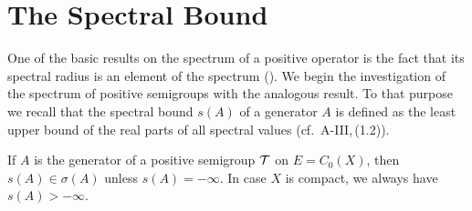 \section{The Spectral Bound}\label{sec:b3-1}%
One of the basic results on the spectrum of a positive operator is the fact that its spectral radius is an element of the spectrum (\citet[V.Proposition~4.1]{schaefer:1974}).
We begin the investigation of the spectrum of positive semigroups with the analogous result.
To that purpose we recall that the spectral bound $s(A)$ of a generator $A$ is defined as the least upper bound of the real parts of all spectral values (cf.\ A-III,\,(1.2)).
%
\begin{theorem}\label{thm:b3-1.1}
If $A$ is the generator of a positive semigroup $\mathcal{T}$ on $E = C_{0}(X)$, then $s(A) \in \sigma(A)$ unless 
$s(A) = -\infty$.
In case $X$ is compact, we always have $s(A) > -\infty$.
\end{theorem}
\vfill
